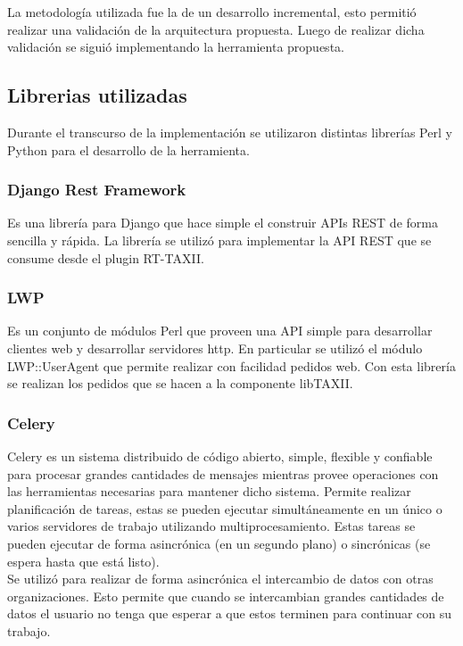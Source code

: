 \documentclass[11pt]{article}
\begin{document}
La metodología utilizada fue la de un desarrollo incremental, esto permitió realizar una validación de la arquitectura propuesta. Luego de realizar dicha validación se siguió implementando la herramienta propuesta.

\subsection{Librerias utilizadas}
Durante el transcurso de la implementación se utilizaron distintas librerías Perl y Python para el desarrollo de la herramienta.

\subsubsection{Django Rest Framework}
Es una librería para Django que hace simple el construir APIs REST de forma sencilla y rápida. La librería se utilizó para implementar la API REST que se consume desde el plugin RT-TAXII.

\subsubsection{LWP}
Es un conjunto de módulos Perl que proveen una API simple para desarrollar clientes web y desarrollar servidores http. En particular se utilizó el módulo LWP::UserAgent que permite realizar con facilidad pedidos web.
Con esta librería se realizan los pedidos que se hacen a la componente  libTAXII.

\subsubsection{Celery}
Celery es un sistema distribuido de código abierto, simple, flexible y confiable para procesar grandes cantidades de mensajes mientras provee operaciones con las herramientas necesarias para mantener dicho sistema. 
Permite realizar planificación de tareas, estas se pueden ejecutar simultáneamente en un único o varios servidores de trabajo utilizando multiprocesamiento. Estas tareas se pueden ejecutar de forma asincrónica (en un segundo plano) o sincrónicas (se espera hasta que está listo).\\

Se utilizó para realizar de forma asincrónica el intercambio de datos con otras organizaciones. Esto permite que cuando se intercambian grandes cantidades de datos el usuario no tenga que esperar a que estos terminen para continuar con su trabajo.
\end{document}
